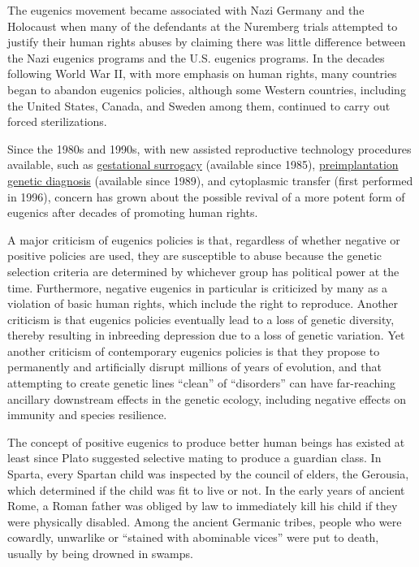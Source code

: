 The eugenics movement became associated with Nazi Germany and the Holocaust when many of the defendants at the Nuremberg trials attempted to justify their human rights abuses by claiming there was little difference between the Nazi eugenics programs and the U.S. eugenics programs. In the decades following World War II, with more emphasis on human rights, many countries began to abandon eugenics policies, although some Western countries, including the United States, Canada, and Sweden among them, continued to carry out forced sterilizations.

Since the 1980s and 1990s, with new assisted reproductive technology procedures available, such as \href{https://en.wikipedia.org/wiki/Surrogacy}{gestational surrogacy} (available since 1985), \href{https://en.wikipedia.org/wiki/Preimplantation_genetic_diagnosis}{preimplantation genetic diagnosis} (available since 1989), and cytoplasmic transfer (first performed in 1996), concern has grown about the possible revival of a more potent form of eugenics after decades of promoting human rights.

A major criticism of eugenics policies is that, regardless of whether negative or positive policies are used, they are susceptible to abuse because the genetic selection criteria are determined by whichever group has political power at the time. Furthermore, negative eugenics in particular is criticized by many as a violation of basic human rights, which include the right to reproduce. Another criticism is that eugenics policies eventually lead to a loss of genetic diversity, thereby resulting in inbreeding depression due to a loss of genetic variation. Yet another criticism of contemporary eugenics policies is that they propose to permanently and artificially disrupt millions of years of evolution, and that attempting to create genetic lines ``clean'' of ``disorders'' can have far-reaching ancillary downstream effects in the genetic ecology, including negative effects on immunity and species resilience.

The concept of positive eugenics to produce better human beings has existed at least since Plato suggested selective mating to produce a guardian class. In Sparta, every Spartan child was inspected by the council of elders, the Gerousia, which determined if the child was fit to live or not. In the early years of ancient Rome, a Roman father was obliged by law to immediately kill his child if they were physically disabled. Among the ancient Germanic tribes, people who were cowardly, unwarlike or ``stained with abominable vices'' were put to death, usually by being drowned in swamps.

